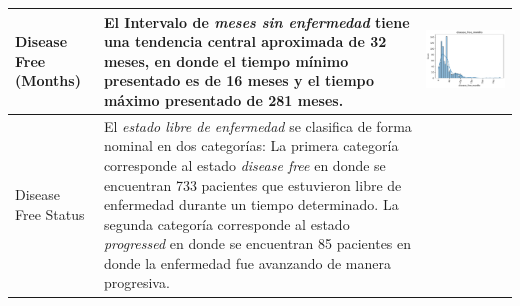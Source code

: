 \begin{table}[!htb]
	\footnotesize
	\begin{threeparttable}
		\begin{tabular}{p{2.5cm} p{7cm} p{6.5cm}} \toprule
			Disease Free (Months)
			& El Intervalo de \textit{meses sin enfermedad} tiene una tendencia central aproximada de 32 meses, en donde el tiempo mínimo presentado es de 16 meses y el tiempo máximo presentado de 281 meses.
			
			& \begin{center}\includegraphics[width=1\linewidth]{NOTEBOOK/IMAGENES_DESCRIPTIVAS/9_disease_free_months}\end{center}
			\\ \hline
			
			Disease Free Status
			& El \textit{estado libre de enfermedad} se clasifica de forma nominal en dos categorías: La primera categoría corresponde al estado \textit{disease free} en donde se encuentran 733 pacientes que estuvieron libre de enfermedad durante un tiempo determinado. La segunda categoría corresponde al estado \textit{progressed} en donde se encuentran 85 pacientes en donde la enfermedad fue avanzando de manera progresiva. 
			

\end{tabular}
\end{threeparttable}
\end{table}
